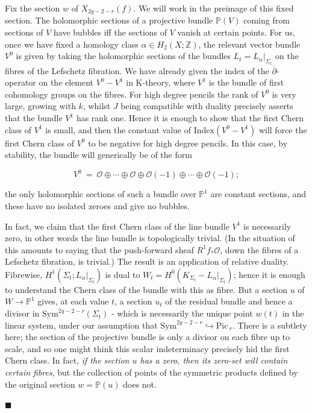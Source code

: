 \documentclass[10pt]{article}
\newcommand{\pp}{\mathbb{P}}
\newcommand{\zz}{\mathbb{Z}}
\newcommand{\cdbar}{\overline{\partial}}
\newcommand{\Sym}{\mathrm{Sym}}
\newcommand{\Pic}{\mathrm{Pic \,}}
\newenvironment{Pf}{\par \noindent{\sc Proof:} }{\quad $\blacksquare$ \par
\vspace{0.5cm}}
\begin{document}
\begin{Pf}
Fix the section $w$ of $X_{2g-2-r}(f)$.  We will work in the preimage of
this fixed section.
The holomorphic sections of a projective bundle $\pp(V)$ coming from
sections of $V$ have bubbles iff the sections of $V$ vanish at certain
points.  For us, once we have fixed a homology class $\alpha \in
H_2(X;\zz)$, 
the relevant vector bundle $V^0$ is given by taking the holomorphic
sections of the bundles $L_t = L_{\alpha}|_{\Sigma_t}$ on the fibres
of the Lefschetz 
fibration.  We have already given the index of the $\cdbar$-operator on the
element $V^0 - V^1$ in K-theory, where $V^1$ is the bundle of first
cohomology groups on the fibres.  For high degree pencils the
rank of $V^0$ is very large, growing with $k$, whilst $J$ being
compatible with duality precisely asserts that the bundle $V^1$ has
rank one.  Hence it is enough to show that the first Chern class of
$V^1$ is small, and then the constant value of $\mathrm{Index}(V^0 -
V^1)$ will force the first Chern class of $V^0$ to be negative for
high degree pencils.  In this case, by stability, the bundle will
generically be of the form

$$V^0 \ = \ \mathcal{O} \oplus \cdots \oplus \mathcal{O} \oplus
\mathcal{O}(-1) \oplus \cdots \oplus \mathcal{O}(-1);$$

\noindent the only holomorphic sections of such a bundle over $\pp^1$
are constant sections, and these have no isolated zeroes and give no bubbles.

\vspace{0.2cm}

\noindent In fact, we claim that the first Chern class of the line
bundle $V^1$ is necessarily zero, in other words the line bundle is
topologically trivial.  (In the situation of \cite{SKDIS} this amounts
to saying that the
push-forward sheaf $R^1 f_* \mathcal{O}$, down the fibres of a
Lefschetz fibration, is trivial.)  The result is an application
of relative duality.  Fibrewise, $H^1 (\Sigma_t;
L_{\alpha}|_{\Sigma_t})$ is dual to $W_t = H^0 (K_{\Sigma_t} -
L_{\alpha}|_{\Sigma_t})$; hence it is enough to understand the Chern
class of the bundle with this as fibre.  But a section $u$ of $W
\rightarrow \pp^1$ 
gives, at each value $t$, a section $u_t$ of the residual bundle and
hence a divisor in $\Sym^{2g-2-r}(\Sigma_t)$ - which is necessarily
the unique point $w(t)$ in the linear system, under our assumption that
$\Sym^{2g-2-r} \hookrightarrow \Pic_r$.
There is a subtlety here;  the section of the projective bundle is
only a divisor on each fibre up to scale, and so one might think this
scalar indeterminacy precisely hid the first Chern class.  In fact,
\emph{if the section $u$ has a zero, then its zero-set will contain
  certain fibres}, but the collection of points of the symmetric
products defined by the original section $w = \pp(u)$ does not.  


\end{Pf}
\end{document}
